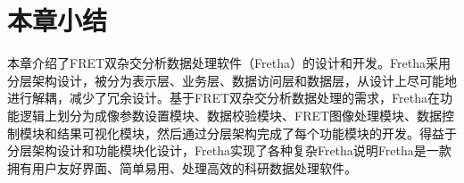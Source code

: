 \section{本章小结}

\ifshowtext
本章介绍了FRET双杂交分析数据处理软件（Fretha）的设计和开发。Fretha采用分层架构设计，被分为表示层、业务层、数据访问层和数据层，从设计上尽可能地进行解耦，减少了冗余设计。基于FRET双杂交分析数据处理的需求，Fretha在功能逻辑上划分为成像参数设置模块、数据校验模块、FRET图像处理模块、数据控制模块和结果可视化模块，然后通过分层架构完成了每个功能模块的开发。得益于分层架构设计和功能模块化设计，Fretha实现了各种复杂Fretha说明Fretha是一款拥有用户友好界面、简单易用、处理高效的科研数据处理软件。
\fi
